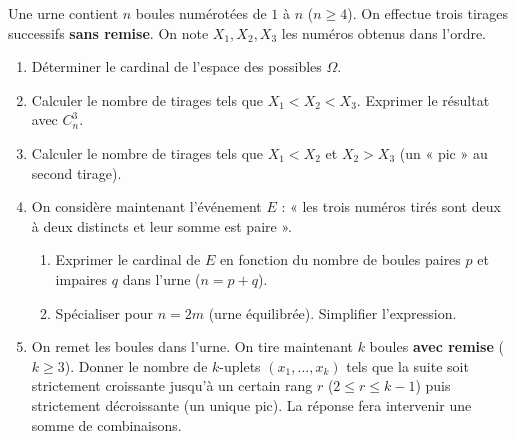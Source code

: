 \documentclass[11pt]{article}
\begin{document}
\begin{exercice}
Une urne contient $n$ boules numérotées de $1$ à $n$ ($n \ge 4$). On effectue trois tirages successifs \textbf{sans remise}. On note $X_1, X_2, X_3$ les numéros obtenus dans l'ordre.
\begin{enumerate}
    \item Déterminer le cardinal de l'espace des possibles $\Omega$.
    \item Calculer le nombre de tirages tels que $X_1 < X_2 < X_3$. Exprimer le résultat avec $C_n^3$.
    \item Calculer le nombre de tirages tels que $X_1 < X_2$ et $X_2 > X_3$ (un « pic » au second tirage).
    \item On considère maintenant l'événement $E$ : « les trois numéros tirés sont deux à deux distincts et leur somme est paire ». 
    \begin{enumerate}
        \item Exprimer le cardinal de $E$ en fonction du nombre de boules paires $p$ et impaires $q$ dans l'urne ($n=p+q$).
        \item Spécialiser pour $n=2m$ (urne équilibrée). Simplifier l'expression.
    \end{enumerate}
    \item On remet les boules dans l'urne. On tire maintenant $k$ boules \textbf{avec remise} ($k \ge 3$). Donner le nombre de $k$-uplets $(x_1,\dots,x_k)$ tels que la suite soit strictement croissante jusqu'à un certain rang $r$ ($2 \le r \le k-1$) puis strictement décroissante (un unique pic). La réponse fera intervenir une somme de combinaisons.
\end{enumerate}
\end{exercice}
\end{document}
